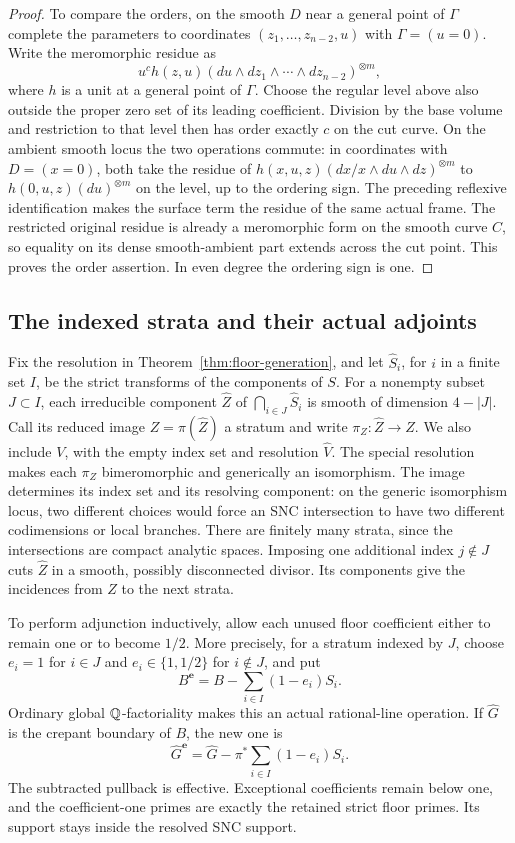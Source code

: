 \begin{proof}
To compare the orders, on the smooth \(D\) near a general point of
\(\Gamma\) complete the parameters to coordinates \((z_1,\ldots,z_{n-2},u)\)
with \(\Gamma=(u=0)\).  Write the meromorphic residue as
\[
 u^c h(z,u)(du\wedge dz_1\wedge\cdots\wedge dz_{n-2})^{\otimes m},
\]
where \(h\) is a unit at a general point of \(\Gamma\).  Choose the
regular level above also outside the proper zero set of its leading
coefficient.  Division by the base volume and restriction to that level
then has order exactly \(c\) on the cut curve.  On the ambient smooth
locus the two operations commute: in coordinates with \(D=(x=0)\),
both take the residue of
\(h(x,u,z)(dx/x\wedge du\wedge dz)^{\otimes m}\) to
\(h(0,u,z)(du)^{\otimes m}\) on the level, up to the ordering sign.
The preceding reflexive identification makes the surface term the residue
of the same actual frame.  The restricted original residue is already a
meromorphic form on the smooth curve \(C\), so equality on its dense
smooth-ambient part extends across the cut point.  This proves the order
assertion.  In even degree the ordering sign is one.
\end{proof}

\subsection{The indexed strata and their actual adjoints}

Fix the resolution in Theorem~\ref{thm:floor-generation}, and let
\(\widehat S_i\), for \(i\) in a finite set \(I\), be the strict transforms
of the components of \(S\).  For a nonempty subset \(J\subset I\), each
irreducible component \(\widehat Z\) of \(\bigcap_{i\in J}\widehat S_i\)
is smooth of dimension \(4-|J|\).  Call its reduced image
\(Z=\pi(\widehat Z)\) a stratum and write \(\pi_Z:\widehat Z\to Z\).
We also include \(V\), with the empty index set and resolution \(\widehat V\).
The special resolution makes each \(\pi_Z\) bimeromorphic and generically
an isomorphism.  The image determines its index set and its resolving
component: on the generic isomorphism locus, two different choices would
force an SNC intersection to have two different codimensions or local
branches.  There are finitely many strata, since the intersections are
compact analytic spaces.  Imposing one additional index \(j\notin J\)
cuts \(\widehat Z\) in a smooth, possibly disconnected divisor.  Its
components give the incidences from \(Z\) to the next strata.

To perform adjunction inductively, allow each unused floor coefficient
either to remain one or to become \(1/2\).  More precisely, for a stratum
indexed by \(J\), choose \(e_i=1\) for \(i\in J\) and
\(e_i\in\{1,1/2\}\) for \(i\notin J\), and put
\[
 B^{\mathbf e}=B-\sum_{i\in I}(1-e_i)S_i.
\]
Ordinary global \(\mathbb Q\)-factoriality makes this an actual rational-line
operation.  If \(\widehat G\) is the crepant boundary of \(B\), the new
one is
\[
 \widehat G^{\mathbf e}=\widehat G-
 \pi^*\sum_{i\in I}(1-e_i)S_i.
\]
The subtracted pullback is effective.  Exceptional coefficients remain
below one, and the coefficient-one primes are exactly the retained strict
floor primes.  Its support stays inside the resolved SNC support.

